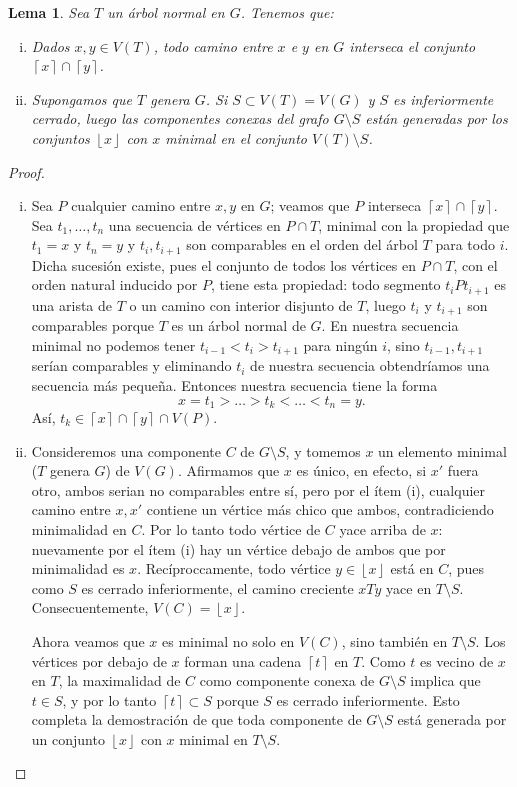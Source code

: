 \documentclass[12pt]{report}
\theoremstyle{plain}
\newtheorem{lemma}[theorem]{Lema}
\theoremstyle{definition}
\newcommand{\ceil}[1]{\left\lceil #1  \right\rceil}
\newcommand{\floor}[1]{\left\lfloor #1  \right\rfloor}
\begin{document}
\begin{lemma}
Sea $T$ un árbol normal en $G$. Tenemos que:
\begin{enumerate}[(i)]
\item Dados $x,y \in V(T)$, todo camino entre $x$ e $y$ en $G$ interseca el conjunto $\ceil x \cap \ceil y$.
\item Supongamos que $T$ genera $G$. Si $S \subset V(T) = V(G)$ y $S$ es inferiormente cerrado, luego las componentes conexas del grafo $G \setminus S$ están generadas por los conjuntos $\floor x$ con $x$ minimal en el conjunto $V(T) \setminus S$.
\end{enumerate}
\end{lemma}
\begin{proof}
\begin{enumerate}[(i)]
\item Sea $P$ cualquier camino entre $x,y$ en $G$; veamos que $P$ interseca $\ceil x \cap \ceil y$. Sea $t_1,\ldots,t_n$ una secuencia de vértices en $P \cap T$, minimal con la propiedad que $t_1 = x$ y $t_n = y$ y $t_i,t_{i+1}$ son comparables en el orden del árbol $T$ para todo $i$. Dicha sucesión existe, pues el conjunto de todos los vértices en $P \cap T$, con el orden natural inducido por $P$, tiene esta propiedad: todo segmento $t_i P t_{i+1}$ es una arista de $T$ o un camino con interior disjunto de $T$, luego $t_i$ y $t_{i+1}$ son comparables porque $T$ es un árbol normal de $G$. En nuestra secuencia minimal no podemos tener $t_{i-1}< t_i > t_{i+1}$ para ningún $i$, sino $t_{i-1},t_{i+1}$ serían comparables y eliminando $t_i$ de nuestra secuencia obtendríamos una secuencia más pequeña. Entonces nuestra secuencia tiene la forma
\[
    x = t_1 > \ldots > t_k < \ldots < t_n = y.
\]
Así, $t_k \in \ceil x \cap \ceil y \cap V(P)$.
\item Consideremos una componente $C$ de $G \setminus S$, y tomemos $x$ un elemento minimal ($T$ genera $G$) de $V(G)$. Afirmamos que $x$ es único, en efecto, si $x'$ fuera otro, ambos serian no comparables entre sí, pero por el ítem (i), cualquier camino entre $x,x'$ contiene un vértice más chico que ambos, contradiciendo minimalidad en $C$. Por lo tanto todo vértice de $C$ yace arriba de $x$: nuevamente por el ítem (i) hay un vértice debajo de ambos que por minimalidad es $x$. Recíproccamente, todo vértice $y \in \floor x$ está en $C$, pues como $S$ es cerrado inferiormente, el camino creciente $x T y$ yace en $T\setminus S$. Consecuentemente, $V(C)= \floor x$.

Ahora veamos que $x$ es minimal no solo en $V(C)$, sino también en $T \setminus S$. Los vértices por debajo de $x$ forman una cadena $\ceil t$ en $T$. Como $t$ es vecino de $x$ en $T$, la maximalidad de $C$ como componente conexa de $G \setminus S$ implica que $t \in S$, y por lo tanto $\ceil t \subset S$ porque $S$ es cerrado inferiormente. Esto completa la demostración de que toda componente de $G\setminus S$ está generada por un conjunto $\floor x$ con $x$ minimal en $T \setminus S$.


\end{enumerate}
\end{proof}
\end{document}

